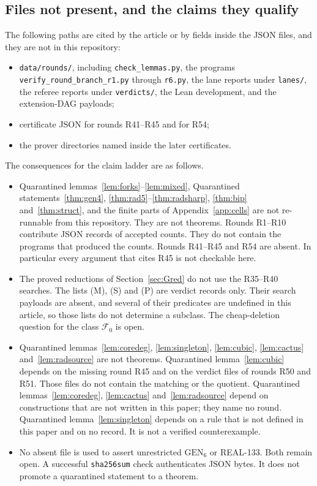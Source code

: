 \documentclass[11pt]{amsart}
\theoremstyle{definition}
\theoremstyle{remark}
\newcommand{\GEN}{\mathrm{GEN}}
\begin{document}
\subsection*{Files not present, and the claims they qualify}
The following paths are cited by the article or by fields inside the JSON files, and they are not in this repository:
\begin{itemize}
\item \nolinkurl{data/rounds/}, including \nolinkurl{check_lemmas.py}, the programs \nolinkurl{verify_round_branch_r1.py} through \texttt{r6.py}, the lane reports under \nolinkurl{lanes/}, the referee reports under \nolinkurl{verdicts/}, the Lean development, and the extension-DAG payloads;
\item certificate JSON for rounds R41--R45 and for R54;
\item the prover directories named inside the later certificates.
\end{itemize}
The consequences for the claim ladder are as follows.
\begin{itemize}
\item Quarantined lemmas~\ref{lem:forks}--\ref{lem:mixed}, Quarantined statements~\ref{thm:gen4}, \ref{thm:rad5}--\ref{thm:radsharp}, \ref{thm:bip} and~\ref{thm:struct}, and the finite parts of Appendix~\ref{app:cells} are not re-runnable from this repository. They are not theorems. Rounds R1--R10 contribute JSON records of accepted counts. They do not contain the programs that produced the counts. Rounds R41--R45 and R54 are absent. In particular every argument that cites R45 is not checkable here.
\item The proved reductions of Section~\ref{sec:Gred} do not use the R35--R40 searches. The lists (M), (S) and (P) are verdict records only. Their search payloads are absent, and several of their predicates are undefined in this article, so those lists do not determine a subclass. The cheap-deletion question for the class $\mathcal F_0$ is open.
\item Quarantined lemmas~\ref{lem:coredeg}, \ref{lem:singleton}, \ref{lem:cubic}, \ref{lem:cactus} and~\ref{lem:radsource} are not theorems. Quarantined lemma~\ref{lem:cubic} depends on the missing round R45 and on the verdict files of rounds R50 and R51. Those files do not contain the matching or the quotient. Quarantined lemmas~\ref{lem:coredeg}, \ref{lem:cactus} and~\ref{lem:radsource} depend on constructions that are not written in this paper; they name no round. Quarantined lemma~\ref{lem:singleton} depends on a rule that is not defined in this paper and on no record. It is not a verified counterexample.
\item No absent file is used to assert unrestricted $\GEN_6$ or REAL-133. Both remain open. A successful \texttt{sha256sum} check authenticates JSON bytes. It does not promote a quarantined statement to a theorem.
\end{itemize}
\end{document}
